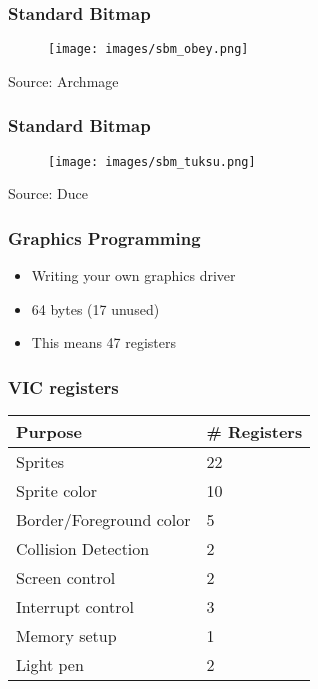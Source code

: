 
\begin{frame}
\frametitle{Standard Bitmap}

\begin{figure}
\texttt{[image: images/sbm\_obey.png]}
\end{figure}

\begin{center}
Source: Archmage
\end{center}

\end{frame}


\begin{frame}
\frametitle{Standard Bitmap}

\begin{figure}
\texttt{[image: images/sbm\_tuksu.png]}
\end{figure}

\begin{center}
Source: Duce
\end{center}

\end{frame}


\begin{frame}
\frametitle{Graphics Programming}

\begin{itemize}
\item Writing your own graphics driver
\item 64 bytes (17 unused)
\item This means 47 registers
\end{itemize}

\end{frame}


\begin{frame}
\frametitle{VIC registers}

\begin{tabular}{|l|l|}
\hline Purpose & \# Registers \\ \hline
Sprites & 22 \\
Sprite color & 10 \\
Border/Foreground color & 5 \\
Collision Detection & 2 \\
Screen control & 2 \\
Interrupt control & 3 \\
Memory setup & 1 \\
Light pen & 2 \\ \hline
\end{tabular}

\end{frame}


